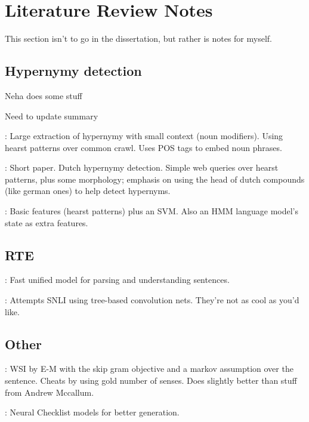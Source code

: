 \chapter{Literature Review Notes}

{This section isn't to go in the dissertation, but rather is notes
for myself.}

\section{Hypernymy detection}

\cite{nayak:2015:techreport} Neha does some stuff

\cite{vylomova:2016:acl} Need to update summary

\cite{seitner:2016:lrec}: Large extraction of hypernymy with small context (noun
modifiers). Using hearst patterns over common crawl. Uses POS tags to embed
noun phrases.

\cite{sang:2007:acl}: Short paper. Dutch hypernymy detection. Simple web
queries over hearst patterns, plus some morphology; emphasis on using the head
of dutch compounds (like german ones) to help detect hypernyms.

\cite{ritter:2009:aaai}: Basic features (hearst patterns) plus an SVM. Also an
HMM language model's state as extra features.

\section{RTE}

\cite{bowman:2016:acl}: Fast unified model for parsing and understanding
sentences.

\cite{mou:2016:acl}: Attempts SNLI using tree-based convolution nets. They're
not as cool as you'd like.

\section{Other}

\cite{qiu:2016:emnlp}: WSI by E-M with the skip gram objective and a markov
assumption over the sentence. Cheats by using gold number of senses. Does
slightly better than stuff from Andrew Mccallum.

\cite{kiddon:2016:emnlp}: Neural Checklist models for better generation.



